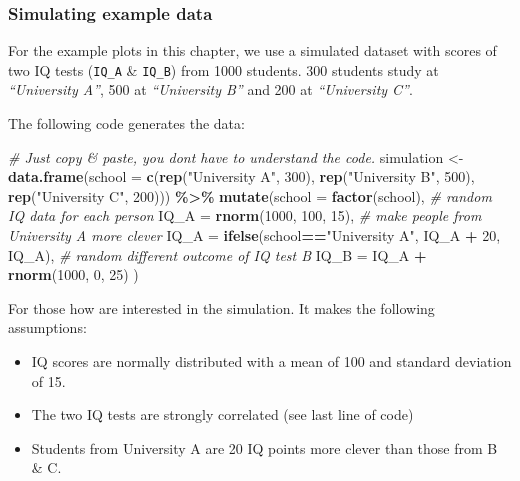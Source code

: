 \documentclass[
]{scrartcl}
\makeatletter
\newenvironment{Shaded}{\begin{snugshade}}{\end{snugshade}}
\newcommand{\AttributeTok}[1]{\textcolor[rgb]{0.13,0.29,0.53}{#1}}
\newcommand{\CommentTok}[1]{\textcolor[rgb]{0.56,0.35,0.01}{\textit{#1}}}
\newcommand{\DecValTok}[1]{\textcolor[rgb]{0.00,0.00,0.81}{#1}}
\newcommand{\FunctionTok}[1]{\textcolor[rgb]{0.13,0.29,0.53}{\textbf{#1}}}
\newcommand{\NormalTok}[1]{#1}
\newcommand{\OtherTok}[1]{\textcolor[rgb]{0.56,0.35,0.01}{#1}}
\newcommand{\SpecialCharTok}[1]{\textcolor[rgb]{0.81,0.36,0.00}{\textbf{#1}}}
\newcommand{\StringTok}[1]{\textcolor[rgb]{0.31,0.60,0.02}{#1}}
\providecommand{\tightlist}{%
  \setlength{\itemsep}{0pt}\setlength{\parskip}{0pt}}
\newenvironment{kframe}{%
\medskip{}
\setlength{\fboxsep}{.8em}
 \def\at@end@of@kframe{}%
 \ifinner\ifhmode%
  \def\at@end@of@kframe{\end{minipage}}%
  \begin{minipage}{\columnwidth}%
 \fi\fi%
 \def\FrameCommand##1{\hskip\@totalleftmargin \hskip-\fboxsep
 \colorbox{shadecolor}{##1}\hskip-\fboxsep
     \hskip-\linewidth \hskip-\@totalleftmargin \hskip\columnwidth}%
 \MakeFramed {\advance\hsize-\width
   \@totalleftmargin\z@ \linewidth\hsize
   \@setminipage}}%
 {\par\unskip\endMakeFramed%
 \at@end@of@kframe}
\newenvironment{rmdblock}[1]
  {
  \begin{itemize}
  \renewcommand{\labelitemi}{
    \raisebox{-.7\height}[0pt][0pt]{
      {\setkeys{Gin}{width=3em,keepaspectratio}\texttt{[image: images/\#1]}}
    }
  }
  \setlength{\fboxsep}{1em}
  \begin{kframe}
  \item
  }
  {
  \end{kframe}
  \end{itemize}
  }
\newenvironment{geek}
    {\begin{rmdblock}{geek}}
    {\end{rmdblock}}
\makeatother
\begin{document}
\subsubsection*{Simulating example data}\label{simulating-example-data}

For the example plots in this chapter, we use a simulated dataset with scores of two IQ tests (\texttt{IQ\_A} \& \texttt{IQ\_B}) from 1000 students. 300 students study at \emph{``University A''}, 500 at \emph{``University B''} and 200 at \emph{``University C''}.

The following code generates the data:

\begin{Shaded}
\begin{Highlighting}[]
\CommentTok{\# Just copy \& paste, you don\textquotesingle{}t have to understand the code.}
\NormalTok{simulation }\OtherTok{\textless{}{-}} \FunctionTok{data.frame}\NormalTok{(}\AttributeTok{school =} \FunctionTok{c}\NormalTok{(}\FunctionTok{rep}\NormalTok{(}\StringTok{"University A"}\NormalTok{, }\DecValTok{300}\NormalTok{),}
                              \FunctionTok{rep}\NormalTok{(}\StringTok{"University B"}\NormalTok{, }\DecValTok{500}\NormalTok{),}
                              \FunctionTok{rep}\NormalTok{(}\StringTok{"University C"}\NormalTok{, }\DecValTok{200}\NormalTok{))) }\SpecialCharTok{\%\textgreater{}\%}
        \FunctionTok{mutate}\NormalTok{(}\AttributeTok{school =} \FunctionTok{factor}\NormalTok{(school),}
             \CommentTok{\# random IQ data for each person}
             \AttributeTok{IQ\_A =} \FunctionTok{rnorm}\NormalTok{(}\DecValTok{1000}\NormalTok{, }\DecValTok{100}\NormalTok{, }\DecValTok{15}\NormalTok{),}
             \CommentTok{\# make people from University A more clever}
             \AttributeTok{IQ\_A =} \FunctionTok{ifelse}\NormalTok{(school}\SpecialCharTok{==}\StringTok{"University A"}\NormalTok{, IQ\_A }\SpecialCharTok{+} \DecValTok{20}\NormalTok{, IQ\_A),}
             \CommentTok{\# random different outcome of IQ test B}
             \AttributeTok{IQ\_B =}\NormalTok{ IQ\_A }\SpecialCharTok{+} \FunctionTok{rnorm}\NormalTok{(}\DecValTok{1000}\NormalTok{, }\DecValTok{0}\NormalTok{, }\DecValTok{25}\NormalTok{) )}
\end{Highlighting}
\end{Shaded}

\begin{geek}
For those how are interested in the simulation. It makes the following
assumptions:

\begin{itemize}
\tightlist
\item
  IQ scores are normally distributed with a mean of 100 and standard
  deviation of 15.
\item
  The two IQ tests are strongly correlated (see last line of code)
\item
  Students from University A are 20 IQ points more clever than those
  from B \& C.
\end{itemize}
\end{geek}
\end{document}
